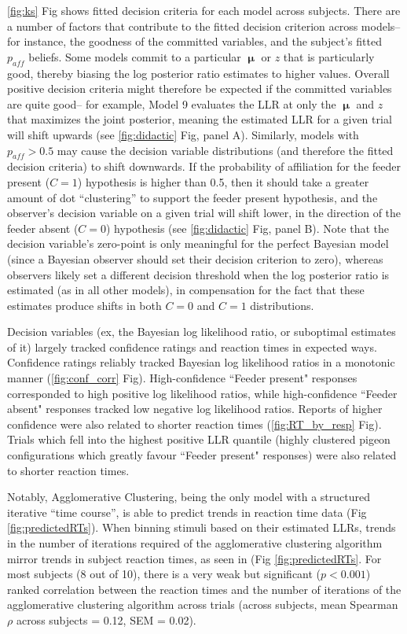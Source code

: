\documentclass{article}
\newcommand{\mu}{\boldsymbol\upmu}
\begin{document}
\ref{fig:ks} Fig shows fitted decision criteria for each model across subjects. There are a number of factors that contribute to the fitted decision criterion across models-- for instance, the goodness of the committed variables, and the subject's fitted $p_{aff}$ beliefs. Some models commit to a particular $\mu$ or $z$ that is particularly good, thereby biasing the log posterior ratio estimates to higher values. Overall positive decision criteria might therefore be expected if the committed variables are quite good-- for example, Model 9 evaluates the LLR at only the $\mu$ and $z$ that maximizes the joint posterior, meaning the estimated LLR for a given trial will shift upwards (see \ref{fig:didactic} Fig, panel A). Similarly, models with $p_{aff} > 0.5$ may cause the decision variable distributions (and therefore the fitted decision criteria) to shift downwards. If the probability of affiliation for the feeder present ($C=1$) hypothesis is higher than 0.5, then it should take a greater amount of dot ``clustering'' to support the feeder present hypothesis, and the observer's decision variable on a given trial will shift lower, in the direction of the feeder absent ($C=0$) hypothesis (see \ref{fig:didactic} Fig, panel B). Note that the decision variable's zero-point is only meaningful for the perfect Bayesian model (since a Bayesian observer should set their decision criterion to zero), whereas observers likely set a different decision threshold when the log posterior ratio is estimated (as in all other models), in compensation for the fact that these estimates produce shifts in both $C=0$ and $C=1$ distributions.

Decision variables (ex, the Bayesian log likelihood ratio, or suboptimal estimates of it) largely tracked confidence ratings and reaction times in expected ways. Confidence ratings reliably tracked Bayesian log likelihood ratios in a monotonic manner (\ref{fig:conf_corr} Fig). High-confidence ``Feeder present" responses corresponded to high positive log likelihood ratios, while high-confidence ``Feeder absent" responses tracked low negative log likelihood ratios. Reports of higher confidence were also related to shorter reaction times (\ref{fig:RT_by_resp} Fig). Trials which fell into the highest positive LLR quantile (highly clustered pigeon configurations which greatly favour ``Feeder present" responses) were also related to shorter reaction times. 

Notably, Agglomerative Clustering, being the only model with a structured iterative ``time course'', is able to predict trends in reaction time data (Fig \ref{fig:predictedRTs}). When binning stimuli based on their estimated LLRs, trends in the number of iterations required of the agglomerative clustering algorithm mirror trends in subject reaction times, as seen in (Fig \ref{fig:predictedRTs}. For most subjects (8 out of 10), there is a very weak but significant ($p<0.001$) ranked correlation between the reaction times and the number of iterations of the agglomerative clustering algorithm across trials (across subjects, mean Spearman $\rho$ across subjects = 0.12, SEM = 0.02).
\end{document}
